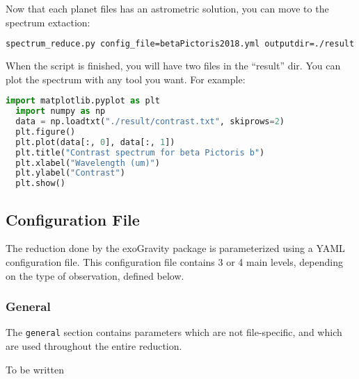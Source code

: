 Now that each planet files has an astrometric solution, you can move to the spectrum extaction:
\begin{lstlisting}[language=bash]
spectrum_reduce.py config_file=betaPictoris2018.yml outputdir=./result
\end{lstlisting}

\noindent{}When the script is finished, you will have two files in the ``result'' dir. You can plot the spectrum with any tool you want. For example:
\begin{lstlisting}[language=python]
  import matplotlib.pyplot as plt
  import numpy as np
  data = np.loadtxt("./result/contrast.txt", skiprows=2)
  plt.figure()
  plt.plot(data[:, 0], data[:, 1])
  plt.title("Contrast spectrum for beta Pictoris b")
  plt.xlabel("Wavelength (um)")
  plt.ylabel("Contrast")  
  plt.show()
\end{lstlisting}

\subsection{Configuration File}

The reduction done by the exoGravity package is parameterized using a YAML configuration file. This configuration file contains 3 or 4 main levels, depending on the type of observation, defined below.

\subsubsection{General}
The \verb|general| section contains parameters which are not file-specific, and which are used throughout the entire reduction.

To be written






